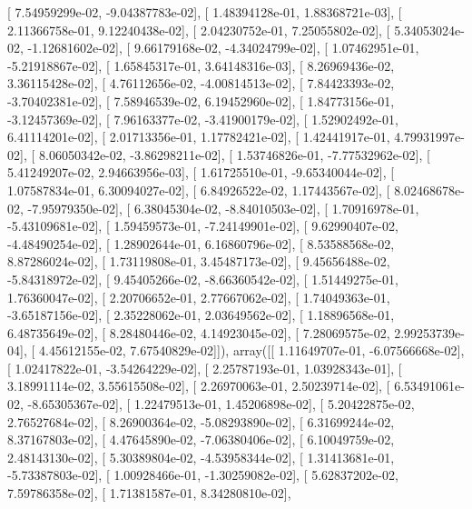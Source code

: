 \documentclass{article}
\begin{document}
       [  7.54959299e-02,  -9.04387783e-02],
       [  1.48394128e-01,   1.88368721e-03],
       [  2.11366758e-01,   9.12240438e-02],
       [  2.04230752e-01,   7.25055802e-02],
       [  5.34053024e-02,  -1.12681602e-02],
       [  9.66179168e-02,  -4.34024799e-02],
       [  1.07462951e-01,  -5.21918867e-02],
       [  1.65845317e-01,   3.64148316e-03],
       [  8.26969436e-02,   3.36115428e-02],
       [  4.76112656e-02,  -4.00814513e-02],
       [  7.84423393e-02,  -3.70402381e-02],
       [  7.58946539e-02,   6.19452960e-02],
       [  1.84773156e-01,  -3.12457369e-02],
       [  7.96163377e-02,  -3.41900179e-02],
       [  1.52902492e-01,   6.41114201e-02],
       [  2.01713356e-01,   1.17782421e-02],
       [  1.42441917e-01,   4.79931997e-02],
       [  8.06050342e-02,  -3.86298211e-02],
       [  1.53746826e-01,  -7.77532962e-02],
       [  5.41249207e-02,   2.94663956e-03],
       [  1.61725510e-01,  -9.65340044e-02],
       [  1.07587834e-01,   6.30094027e-02],
       [  6.84926522e-02,   1.17443567e-02],
       [  8.02468678e-02,  -7.95979350e-02],
       [  6.38045304e-02,  -8.84010503e-02],
       [  1.70916978e-01,  -5.43109681e-02],
       [  1.59459573e-01,  -7.24149901e-02],
       [  9.62990407e-02,  -4.48490254e-02],
       [  1.28902644e-01,   6.16860796e-02],
       [  8.53588568e-02,   8.87286024e-02],
       [  1.73119808e-01,   3.45487173e-02],
       [  9.45656488e-02,  -5.84318972e-02],
       [  9.45405266e-02,  -8.66360542e-02],
       [  1.51449275e-01,   1.76360047e-02],
       [  2.20706652e-01,   2.77667062e-02],
       [  1.74049363e-01,  -3.65187156e-02],
       [  2.35228062e-01,   2.03649562e-02],
       [  1.18896568e-01,   6.48735649e-02],
       [  8.28480446e-02,   4.14923045e-02],
       [  7.28069575e-02,   2.99253739e-04],
       [  4.45612155e-02,   7.67540829e-02]]), array([[  1.11649707e-01,  -6.07566668e-02],
       [  1.02417822e-01,  -3.54264229e-02],
       [  2.25787193e-01,   1.03928343e-01],
       [  3.18991114e-02,   3.55615508e-02],
       [  2.26970063e-01,   2.50239714e-02],
       [  6.53491061e-02,  -8.65305367e-02],
       [  1.22479513e-01,   1.45206898e-02],
       [  5.20422875e-02,   2.76527684e-02],
       [  8.26900364e-02,  -5.08293890e-02],
       [  6.31699244e-02,   8.37167803e-02],
       [  4.47645890e-02,  -7.06380406e-02],
       [  6.10049759e-02,   2.48143130e-02],
       [  5.30389804e-02,  -4.53958344e-02],
       [  1.31413681e-01,  -5.73387803e-02],
       [  1.00928466e-01,  -1.30259082e-02],
       [  5.62837202e-02,   7.59786358e-02],
       [  1.71381587e-01,   8.34280810e-02],
\end{document}
